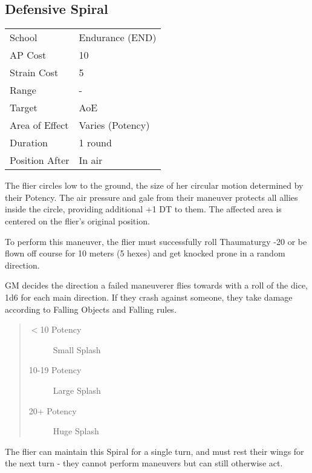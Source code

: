 \documentclass[11pt,a4paper,twocolumn]{book}
\begin{document}
\subsection*{Defensive Spiral}
{
	\begin{tabu} to 75mm{| X[l,4] | X[l,7] |}
		\hline
		School 			& Endurance (END) 	\\
		AP Cost	      	& 10 				\\
		Strain Cost     & 5 				\\
		Range     		& - 				\\
		Target      	& AoE 				\\
		Area of Effect  & Varies (Potency)	\\
		Duration     	& 1 round	 		\\
		Position After  & In air 			\\ \hline
	\end{tabu}
	
}

\medskip

The flier circles low to the ground, the size of her circular motion  determined by their Potency. The air pressure and gale from their maneuver protects all allies inside the circle, providing additional +1 DT to them. The affected area is centered on the flier's original position.

To perform this maneuver, the flier must successfully roll Thaumaturgy -20 or be flown off course for 10 meters (5 hexes) and get knocked prone in a random direction.

GM decides the direction a failed maneuverer flies towards with a roll of the dice, 1d6 for each main direction. If they crash against someone, they take damage according to Falling Objects and Falling rules.

\begin{quote}
	\begin{description}
		\item[$<$10 Potency] 	Small Splash
		\item[10-19 Potency] 	Large Splash
		\item[20+ Potency] 	Huge Splash
	\end{description}
\end{quote}

The flier can maintain this Spiral for a single turn, and must rest their wings for the next turn - they cannot perform maneuvers but can still otherwise act.
\end{document}
